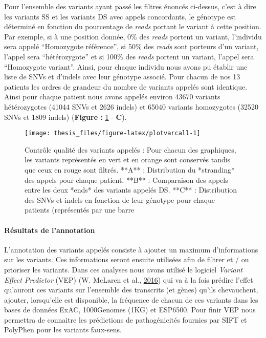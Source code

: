 \documentclass[12pt,twoside]{reedthesis}
\theoremstyle{definition}
\theoremstyle{definition}
\theoremstyle{remark}
\begin{document}
  Pour l'ensemble des variants ayant passé les filtres énoncés ci-dessus,
  c'est à dire les variants SS et les variants DS avec appels concordants,
  le génotype est déterminé en fonction du pourcentage de \emph{reads}
  portant le variant à cette position. Par exemple, si à une position
  donnée, 0\% des \emph{reads} portent un variant, l'individu sera appelé
  ``Homozygote référence'', si 50\% des \emph{reads} sont porteurs d'un
  variant, l'appel sera ``hétérozygote'' et si 100\% des \emph{reads}
  portent un variant, l'appel sera ``Homozygote variant''. Ainsi, pour
  chaque individu nous avons pu établir une liste de SNVs et d'indels avec
  leur génotype associé. Pour chacun de nos 13 patients les ordres de
  grandeur du nombre de variants appelés sont identique. Ainsi pour chaque
  patient nous avons appelés environ 43670 variants hétérozygotes (41044
  SNVs et 2626 indels) et 65040 variants homozygotes (32520 SNVs et 1809
  indels) (\textbf{Figure : }\ref{fig:plotvarcall} - \textbf{C}).
  
  \newpage
  
  \begin{figure}
  
  {\centering \texttt{[image: thesis\_files/figure-latex/plotvarcall-1]} 
  
  }
  
  \caption[Contrôle qualité des variants appelés]{Contrôle qualité des variants appelés : Pour chacun des graphiques, les variants représentés en vert et en orange sont conservés tandis que ceux en rouge sont filtrés. **A** : Distribution du *stranding* des appels pour chaque patient. **B** : Comparaison des appels entre les deux *ends* des variants appelés DS. **C** : Distribution des SNVs et indels en fonction de leur génotype pour chaque patients (représentés par une barre}\label{fig:plotvarcall}
  \end{figure}
  
  \newpage
  
  \paragraph{Résultats de l'annotation}\label{resultats-de-lannotation}
  
  L'annotation des variants appelés consiste à ajouter un maximum
  d'informations sur les variants. Ces informations seront ensuite
  utilisées afin de filtrer et / ou prioriser les variants. Dans ces
  analyses nous avons utilisé le logiciel \emph{Variant Effect Predictor}
  (VEP) (W. McLaren et al., \protect\hyperlink{ref-McLaren2016}{2016}) qui
  va à la fois prédire l'effet qu'auront ces variants sur l'ensemble des
  transcrits (et gènes) qu'ils chevauchent, ajouter, lorsqu'elle est
  disponible, la fréquence de chacun de ces variants dans les bases de
  données ExAC, 1000Genomes (1KG) et ESP6500. Pour finir VEP nous
  permettra de connaitre les prédictions de pathogénicités fournies par
  SIFT et PolyPhen pour les variants faux-sens.
  
\end{document}
